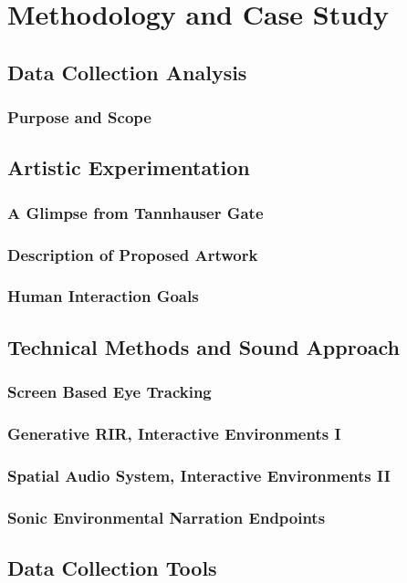\chapter{Methodology and Case Study}
    \section{Data Collection Analysis}
        \subsection{Purpose and Scope}
    \section{Artistic Experimentation}
        \subsection{A Glimpse from Tannhauser Gate}
        \subsection{Description of Proposed Artwork}
        \subsection{Human Interaction Goals}
    \section{Technical Methods and Sound Approach}
        \subsection{Screen Based Eye Tracking}
        \subsection{Generative RIR, Interactive Environments I}
        \subsection{Spatial Audio System, Interactive Environments II}
        \subsection{Sonic Environmental Narration Endpoints}
    \section{Data Collection Tools}
